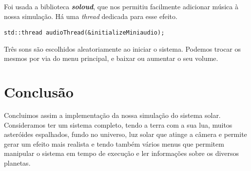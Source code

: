 \noindent
Foi usada a biblioteca \textbf{\textit{soloud}}, que nos permitiu facilmente adicionar música à nossa simulação. Há uma \textit{thread} dedicada para esse efeito.

\begin{lstlisting}[style=Cpp, caption=\textit{Thread} da Música]
std::thread audioThread(&initializeMiniaudio);
\end{lstlisting}

\noindent
Três sons são escolhidos aleatoriamente ao iniciar o sistema. Podemos trocar os mesmos por via do menu principal, e baixar ou aumentar o seu volume.

\section{Conclusão}
\label{chap2:sec:concs}

\noindent
Concluimos assim a implementação da nossa simulação do sistema solar. Consideramos ter um sistema completo, tendo a terra com a sua lua, muitos asteróides espalhados, fundo no universo, luz solar que atinge a câmera e permite gerar um efeito mais realista e tendo também vários menus que permitem manipular o sistema em tempo de execução e ler informações sobre os diversos planetas.
